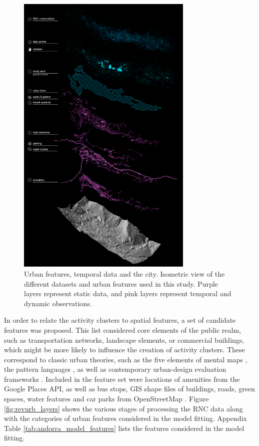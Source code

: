 {
    \begin{figure}[!h]
        \begin{center}
            \includegraphics[width=0.75\textwidth]{chapters/insight/revurb/figures/revurb_features.png}
        \end{center}
        \caption{Urban features, temporal data and the city. Isometric view of the different datasets and urban features used in this study. Purple layers represent static data, and pink layers represent temporal and dynamic observations.}
        \label{fig:revurb_layers}
    \end{figure}

    In order to relate the activity clusters to spatial features, a set of candidate features was proposed. This list considered core elements of the public realm, such as transportation networks, landscape elements, or commercial buildings, which might be more likely to influence the creation of activity clusters. These correspond to classic urban theories, such as the five elements of mental maps \cite{lynch1960image}, the pattern languages \cite{alexander1977pattern}, as well as contemporary urban-design evaluation frameworks \cite{hassan2014evaluation}. Included in the feature set were locations of amenities from the Google Places API, as well as bus stops, GIS shape files of buildings, roads, green spaces, water features and car parks from OpenStreetMap \cite{haklay2008openstreetmap}. Figure \eqref{fig:revurb_layers} shows the various stages of processing the RNC data along with the categories of urban features considered in the model fitting. Appendix Table \eqref{tab:andorra_model_features} lists the features considered in the model fitting.
}

